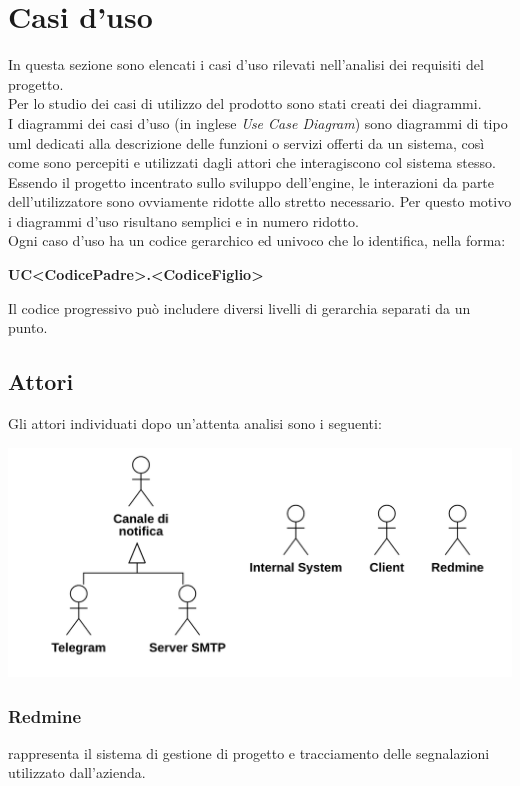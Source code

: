 \section{Casi d'uso}

In questa sezione sono elencati i casi d'uso rilevati nell'analisi dei requisiti del progetto.\\
Per lo studio dei casi di utilizzo del prodotto sono stati creati dei diagrammi.\\
I diagrammi dei casi d'uso (in inglese \emph{Use Case Diagram}) sono diagrammi di tipo \gls{uml} dedicati alla descrizione delle funzioni o servizi offerti da un sistema, così come sono percepiti e utilizzati dagli attori che interagiscono col sistema stesso.
Essendo il progetto incentrato sullo sviluppo dell'engine, le interazioni da parte dell'utilizzatore sono ovviamente ridotte allo stretto necessario. Per questo motivo i diagrammi d'uso risultano semplici e in numero ridotto.\\

\noindent Ogni caso d’uso ha un codice gerarchico ed univoco che lo identifica, nella forma:
\begin{center}
	\textbf{UC<CodicePadre>.<CodiceFiglio>}
\end{center}
Il codice progressivo può includere diversi livelli di gerarchia separati da un punto.

\subsection{Attori}
Gli attori individuati dopo un’attenta analisi sono i seguenti:


\begin{center}
	\includegraphics[keepaspectratio = true, width=15cm]{immagini/actors.png}
\end{center}

\subsubsection{Redmine}
 rappresenta il sistema di gestione di progetto e tracciamento delle segnalazioni utilizzato dall'azienda.
